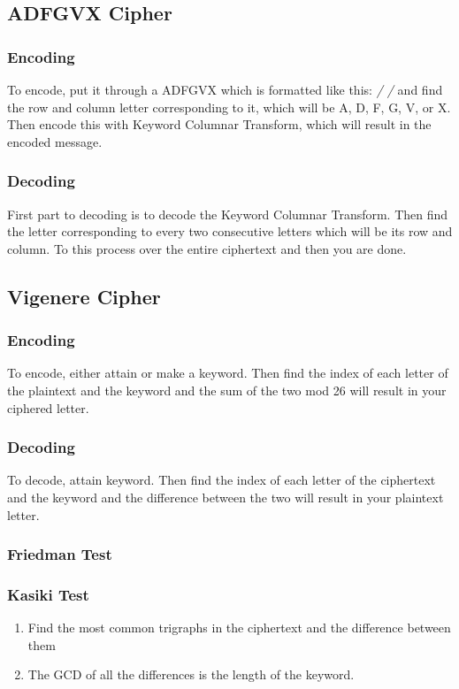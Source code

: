 \documentclass[11pt]{article}
\begin{document}
\subsection{ADFGVX Cipher}
\label{sec-3-1}
\subsubsection{Encoding}
\label{sec-3-1-1}
To encode, put it through a ADFGVX which is formatted like this:
\emph{/ /}
and find the row and column letter corresponding to it, which will be A, D, F, G, V, or X. Then encode this with Keyword Columnar Transform, which will result in the encoded message.
\subsubsection{Decoding}
\label{sec-3-1-2}
First part to decoding is to decode the Keyword Columnar Transform. 
Then find the letter corresponding to every two consecutive letters which will be its row and column. To this process over the
entire ciphertext and then you are done.
\subsection{Vigenere Cipher}
\label{sec-3-2}
\subsubsection{Encoding}
\label{sec-3-2-1}
To encode, either attain or make a keyword. Then find the index of each letter of the plaintext and the keyword and the sum of the two mod 26 will
result in your ciphered letter.
\subsubsection{Decoding}
\label{sec-3-2-2}
To decode, attain  keyword. Then find the index of each letter of the ciphertext and the keyword and the difference between the two will
result in your plaintext letter. 
\subsubsection{Friedman Test}
\label{sec-3-2-3}
\subsubsection{Kasiki Test}
\label{sec-3-2-4}
\begin{enumerate}
\item Find the most common trigraphs in the ciphertext and the difference between them
\label{sec-3-2-4-1}
\item The GCD of all the differences is the length of the keyword.
\label{sec-3-2-4-2}
\end{enumerate}
\end{document}
